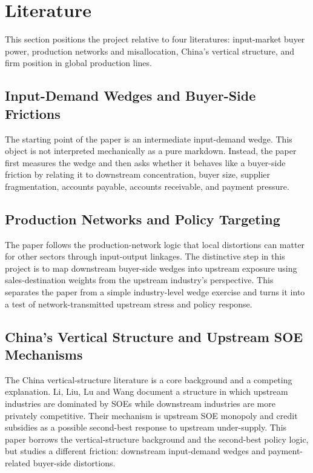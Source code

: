 \section{Literature}

This section positions the project relative to four literatures: input-market buyer power, production networks and misallocation, China's vertical structure, and firm position in global production lines.

\subsection{Input-Demand Wedges and Buyer-Side Frictions}

The starting point of the paper is an intermediate input-demand wedge. This object is not interpreted mechanically as a pure markdown. Instead, the paper first measures the wedge and then asks whether it behaves like a buyer-side friction by relating it to downstream concentration, buyer size, supplier fragmentation, accounts payable, accounts receivable, and payment pressure.

\subsection{Production Networks and Policy Targeting}

The paper follows the production-network logic that local distortions can matter for other sectors through input-output linkages. The distinctive step in this project is to map downstream buyer-side wedges into upstream exposure using sales-destination weights from the upstream industry's perspective. This separates the paper from a simple industry-level wedge exercise and turns it into a test of network-transmitted upstream stress and policy response.

\subsection{China's Vertical Structure and Upstream SOE Mechanisms}

The China vertical-structure literature is a core background and a competing explanation. Li, Liu, Lu and Wang document a structure in which upstream industries are dominated by SOEs while downstream industries are more privately competitive. Their mechanism is upstream SOE monopoly and credit subsidies as a possible second-best response to upstream under-supply. This paper borrows the vertical-structure background and the second-best policy logic, but studies a different friction: downstream input-demand wedges and payment-related buyer-side distortions.

